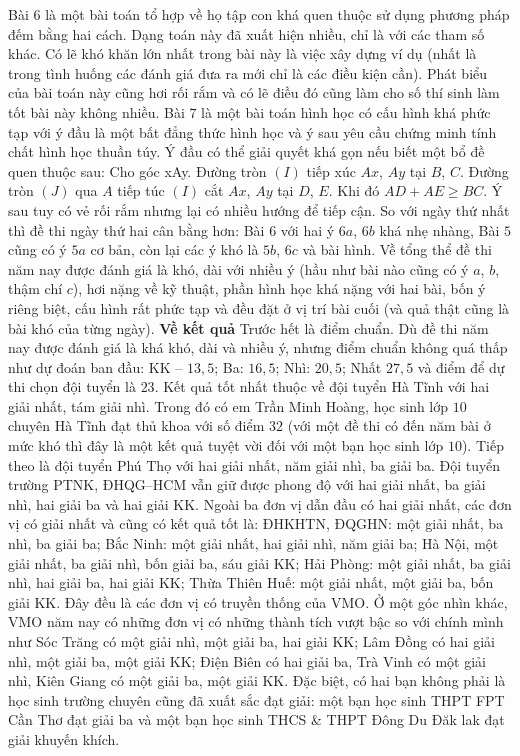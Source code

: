 \begin{multicols}{2}
	\vskip 0.1cm
	Bài $6$ là một bài toán tổ hợp về họ tập con khá quen thuộc sử dụng phương pháp đếm bằng hai cách. Dạng toán này đã xuất hiện nhiều, chỉ là với các tham số khác. Có lẽ khó khăn lớn nhất trong bài này là việc xây dựng ví dụ (nhất là trong tình huống các đánh giá đưa ra mới chỉ là các điều kiện cần). Phát biểu của bài toán này cũng hơi rối rắm và có lẽ điều đó cũng làm cho số thí sinh làm tốt bài này không nhiều.
	\vskip 0.1cm
	Bài $7$ là một bài toán hình học có cấu hình khá phức tạp với ý đầu là một bất đẳng thức hình học và ý sau yêu cầu chứng minh tính chất hình học thuần túy. Ý đầu có thể giải quyết khá gọn nếu biết một bổ đề quen thuộc sau: Cho góc xAy. Đường tròn $(I)$ tiếp xúc $Ax$, $Ay$ tại $B$, $C$. Đường tròn $(J)$ qua $A$ tiếp túc $(I)$ cắt $Ax$, $Ay$ tại $D$, $E$. Khi đó $AD + AE \ge BC$. Ý sau tuy có vẻ rối rắm nhưng lại có nhiều hướng để tiếp cận.
	\vskip 0.1cm
	So với ngày thứ nhất thì đề thi ngày thứ hai cân bằng hơn: Bài $6$ với hai ý $6a$, $6b$ khá nhẹ nhàng, Bài $5$ cũng có ý $5a$ cơ bản, còn lại các ý khó là $5b$, $6c$ và bài hình. 
	\vskip 0.1cm
	Về tổng thể đề thi năm nay được đánh giá là khó, dài với nhiều ý (hầu như bài nào cũng có ý $a$, $b$, thậm chí $c$), hơi nặng về kỹ thuật, phần hình học khá nặng với hai bài, bốn ý riêng biệt, cấu hình rất phức tạp và đều đặt ở vị trí bài cuối (và quả thật cũng là bài khó của từng ngày).
	\vskip 0.1cm
	\textbf{Về kết quả}
	\vskip 0.1cm
	Trước hết là điểm chuẩn. Dù đề thi năm nay được đánh giá là khá khó, dài và nhiều ý, nhưng điểm chuẩn không quá thấp như dự đoán ban đầu: KK -- $13{,}5$; Ba: $16{,}5$; Nhì: $20{,}5$; Nhất $27{,}5$ và điểm để dự thi chọn đội tuyển là $23$. 
	\vskip 0.1cm
	Kết quả tốt nhất thuộc về đội tuyển Hà Tĩnh với hai giải nhất, tám giải nhì. Trong đó có em Trần Minh Hoàng, học sinh lớp $10$ chuyên Hà Tĩnh đạt thủ khoa với số điểm $32$ (với một đề thi có đến năm bài ở mức khó thì đây là một kết quả tuyệt vời đối với một bạn học sinh lớp $10$).
	\vskip 0.1cm
	Tiếp theo là đội tuyển Phú Thọ với hai giải nhất, năm giải nhì, ba giải ba. Đội tuyển trường PTNK, ĐHQG--HCM vẫn giữ được phong độ với hai giải nhất, ba giải nhì, hai giải ba và hai giải KK. 
	\vskip 0.1cm
	Ngoài ba đơn vị dẫn đầu có hai giải nhất, các đơn vị có giải nhất và cũng có kết quả tốt là: ĐHKHTN, ĐQGHN: một giải nhất, ba nhì, ba giải ba; Bắc Ninh: một giải nhất, hai giải nhì, năm giải ba; Hà Nội, một giải nhất, ba giải nhì, bốn giải ba, sáu giải KK; Hải Phòng: một giải nhất, ba giải nhì, hai giải ba, hai giải KK; Thừa Thiên Huế: một giải nhất, một giải ba, bốn giải KK.
	\vskip 0.1cm
	Đây đều là các đơn vị có truyền thống của VMO. Ở một góc nhìn khác, VMO năm nay có những đơn vị có những thành tích vượt bậc so với chính mình như Sóc Trăng có một giải nhì, một giải ba, hai giải KK; Lâm Đồng có hai giải nhì, một giải ba, một giải KK; Điện Biên có hai giải ba, Trà Vinh có một giải nhì, Kiên Giang có một giải  ba, một giải KK. Đặc biệt, có hai bạn không phải là học sinh trường chuyên cũng đã xuất sắc đạt giải: một bạn học sinh THPT FPT Cần Thơ đạt giải ba và một bạn học sinh THCS \& THPT Đông Du Đăk lak đạt giải khuyến khích. 

\end{multicols}
